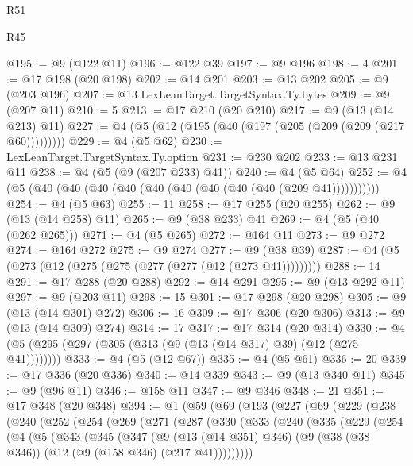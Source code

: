 \begin{lexlean}{R51}
\begin{lexlean}{R45}
\begin{coremodule}
{{{{{{{{{{{{{{{{{{{{{{{{{{{{{{{{{{{{{{{{{{{{{{{{{{{{{{{{{{{{{{{{{{{{{{{{{{{{{{{{{{{{{{{{{{{@195 := @9 (@122 @11)
@196 := @122 @39
@197 := @9 @196
@198 := 4
@201 := @17 @198 (@20 @198)
@202 := @14 @201
@203 := @13 @202
@205 := @9 (@203 @196)
@207 := @13 LexLeanTarget.TargetSyntax.Ty.bytes
@209 := @9 (@207 @11)
@210 := 5
@213 := @17 @210 (@20 @210)
@217 := @9 (@13 (@14 @213) @11)
@227 := @4 (@5 (@12 (@195 (@40 (@197 (@205 (@209 (@209 (@217 @60)))))))))
@229 := @4 (@5 @62)
@230 := LexLeanTarget.TargetSyntax.Ty.option
@231 := @230 @202
@233 := @13 @231 @11
@238 := @4 (@5 (@9 (@207 @233) @41))
@240 := @4 (@5 @64)
@252 := @4 (@5 (@40 (@40 (@40 (@40 (@40 (@40 (@40 (@40 (@40 (@209 @41)))))))))))
@254 := @4 (@5 @63)
@255 := 11
@258 := @17 @255 (@20 @255)
@262 := @9 (@13 (@14 @258) @11)
@265 := @9 (@38 @233) @41
@269 := @4 (@5 (@40 (@262 @265)))
@271 := @4 (@5 @265)
@272 := @164 @11
@273 := @9 @272
@274 := @164 @272
@275 := @9 @274
@277 := @9 (@38 @39)
@287 := @4 (@5 (@273 (@12 (@275 (@275 (@277 (@277 (@12 (@273 @41)))))))))
@288 := 14
@291 := @17 @288 (@20 @288)
@292 := @14 @291
@295 := @9 (@13 @292 @11)
@297 := @9 (@203 @11)
@298 := 15
@301 := @17 @298 (@20 @298)
@305 := @9 (@13 (@14 @301) @272)
@306 := 16
@309 := @17 @306 (@20 @306)
@313 := @9 (@13 (@14 @309) @274)
@314 := 17
@317 := @17 @314 (@20 @314)
@330 := @4 (@5 (@295 (@297 (@305 (@313 (@9 (@13 (@14 @317) @39) (@12 (@275 @41))))))))
@333 := @4 (@5 (@12 @67))
@335 := @4 (@5 @61)
@336 := 20
@339 := @17 @336 (@20 @336)
@340 := @14 @339
@343 := @9 (@13 @340 @11)
@345 := @9 (@96 @11)
@346 := @158 @11
@347 := @9 @346
@348 := 21
@351 := @17 @348 (@20 @348)
@394 := @1
    (@59
      (@69
        (@193
          (@227
            (@69
              (@229
                (@238
                  (@240
                    (@252
                      (@254
                        (@269
                          (@271
                            (@287
                              (@330
                                (@333
                                  (@240
                                    (@335
                                      (@229
                                        (@254
                                          (@4
                                            (@5
                                              (@343
                                                (@345
                                                  (@347
                                                    (@9
                                                      (@13 (@14 @351) @346)
                                                      (@9
                                                        (@38 (@38 @346))
                                                        (@12 (@9 (@158 @346) (@217 @41)))))))))
}}}}}}}}}}}}}}}}}}}}}}}}}}}}}}}}}}}}}}}}}}}}}}}}}}}}}}}}}}}}}}}}}}}}}}}}}}}}}}}}}}}}}}}}}}}
\end{coremodule}
\end{lexlean}
\end{lexlean}

